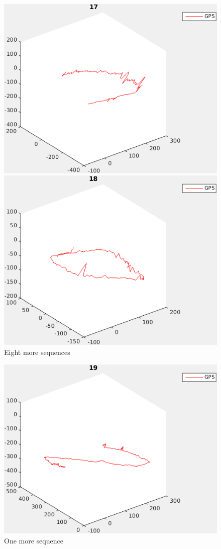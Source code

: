 \documentclass{report}
\begin{document}
\begin{figure}
\begin{minipage}[b]{.5\textwidth}
  \end{minipage}
  \begin{minipage}[b]{.5\textwidth}
    \centering
    \includegraphics[width=.9\textwidth]{17_path}
  \end{minipage}%
  \begin{minipage}[b]{.5\textwidth}
    \centering
    \includegraphics[width=.9\textwidth]{18_path}
  \end{minipage}

  \caption{Eight more sequences}
\end{figure}

\begin{figure}
  \begin{minipage}[b]{\textwidth}
    \centering
    \includegraphics[width=.5\textwidth]{19_path}
  \end{minipage}%

  \caption{One more sequence}\label{fig:1}
\end{figure}

\clearpage


\end{document}
